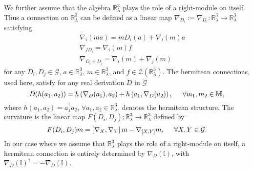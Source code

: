 \documentclass[a4paper,11pt]{article} %
\numberwithin{equation}{section} %
\numberwithin{figure}{section} %
\theoremstyle{plain} %
\theoremstyle{definition} %
\theoremstyle{remark} %
\begin{document}
\noindent
We further assume that the algebra $\mathbb{R}^{3}_{\lambda}$ plays the role of a right-module on itself. Thus a connection on $\mathbb{R}^{3}_{\lambda}$ can be defined as a linear map $\nabla_{D_i} := \nabla_{D_i} : \mathbb{R}^{3}_{\lambda} \rightarrow \mathbb{R}^{3}_{\lambda}$ satisfying
\begin{eqnarray*}
 && \nabla_{i} (ma) = m D_i (a) + \nabla_i (m) a \\
 && \nabla_{ f D_i } = \nabla_i (m) f \\
 && \nabla_{ D_i + D_j } = \nabla_{i}(m) + \nabla_{j} (m)
\end{eqnarray*}
for any $D_i , D_j \in \mathcal{G}$, $a \in \mathbb{R}^{3}_{\lambda}$, $m \in \mathbb{R}^{3}_{\lambda}$, and $f \in \mathcal{Z}(\mathbb{R}^{3}_{\lambda})$. The hermitean connections, used here, satisfy for any real derivation $D$ in $\mathcal{G}$
\begin{equation*}
 D( h(a_1 ,a_2 ) ) = h \left( \nabla_{D}(a_1) , a_2 \right) + h \left( a_1 , \nabla_{D}(a_2) \right), \hspace{5mm} \forall m_1 , m_2 \in \mathbb{M}, 
\end{equation*}
where $h(a_1 , a_2 ) = a_{1}^{\dagger} a_{2}$, $\forall a_1 , a_2 \in \mathbb{R}^3_{\lambda}$, denotes the hermitean structure. The curvature is the linear map $F( D_i , D_j ) : \mathbb{R}^3_{\lambda} \rightarrow \mathbb{R}^3_{\lambda} $ defined by 
\begin{equation*}
 F( D_i , D_j )m = \left[ \nabla_X , \nabla_Y \right]m - \nabla_{[X,Y]}m, \hspace{5mm} \forall X,Y \in \mathcal{G}. 
\end{equation*}
In our case where we assume that $\mathbb{R}^{3}_{\lambda}$ plays the role of a right-module on itself, a hermitean connection is entirely determined by $\nabla_{D}(\mathbb{I})$, with $\nabla_{D}(\mathbb{I})^{\dagger} = - \nabla_{D}(\mathbb{I})$.
\end{document}
